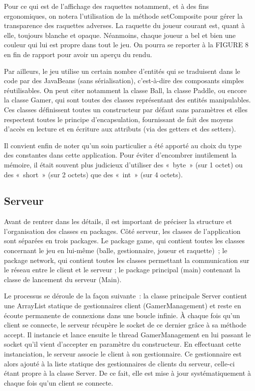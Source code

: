 \documentclass[a4paper,12pt]{article}
\begin{document}
Pour ce qui est de l'affichage des raquettes notamment, et à des fins ergonomiques, on notera l'utilisation de la méthode setComposite pour gérer la transparence des raquettes adverses. La raquette du joueur courant est, quant à elle, toujours blanche et opaque. Néanmoins, chaque joueur a bel et bien une couleur qui lui est propre dans tout le jeu. On pourra se reporter à la FIGURE 8 en fin de rapport pour avoir un aperçu du rendu.

Par ailleurs, le jeu utilise un certain nombre d'entités qui se traduisent dans le code par des JavaBeans (sans sérialisation), c'est-à-dire des composants simples réutilisables. On peut citer notamment la classe Ball, la classe Paddle, ou encore la classe Gamer, qui sont toutes des classes représentant des entités manipulables. Ces classes définissent toutes un constructeur par défaut sans paramètres et elles respectent toutes le principe d'encapsulation, fournissant de fait des moyens d'accès en lecture et en écriture aux attributs (via des getters et des setters).

Il convient enfin de noter qu'un soin particulier a été apporté au choix du type des constantes dans cette application. Pour éviter d'encombrer inutilement la mémoire, il était souvent plus judicieux d'utiliser des «~byte~» (sur 1 octet) ou des «~short~» (sur 2 octets) que des «~int~» (sur 4 octets).

\subsection{Serveur}

Avant de rentrer dans les détails, il est important de préciser la structure et l'organisation des classes en packages. Côté serveur, les classes de l'application sont séparées en trois packages. Le package game, qui contient toutes les classes concernant le jeu en lui-même (balle, gestionnaire, joueur et raquette)~; le package network, qui contient toutes les classes permettant la communication sur le réseau entre le client et le serveur ; le package principal (main) contenant la classe de lancement du serveur (Main).

Le processus se déroule de la façon suivante~: la classe principale Server contient une ArrayList statique de gestionnaires client (GamerManagement) et reste en écoute permanente de connexions dans une boucle infinie. À chaque fois qu'un client se connecte, le serveur récupère le socket de ce dernier grâce à sa méthode accept. Il instancie et lance ensuite le thread GamerManagement en lui passant le socket qu'il vient d'accepter en paramètre du constructeur. En effectuant cette instanciation, le serveur associe le client à son gestionnaire. Ce gestionnaire est alors ajouté à la liste statique des gestionnaires de clients du serveur, celle-ci étant propre à la classe Server. De ce fait, elle est mise à jour systématiquement à chaque fois qu'un client se connecte.
\end{document}
